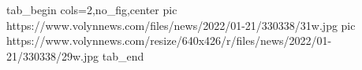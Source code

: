  
 
 
 
 


\ifcmt
  tab_begin cols=2,no_fig,center
     pic https://www.volynnews.com/files/news/2022/01-21/330338/31w.jpg
		 pic https://www.volynnews.com/resize/640x426/r/files/news/2022/01-21/330338/29w.jpg
  tab_end
\fi
